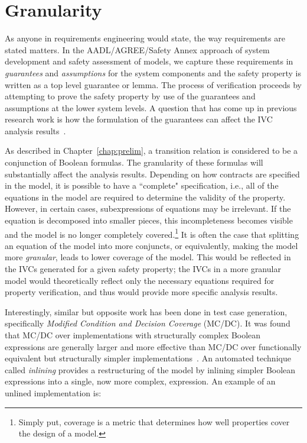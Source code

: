 \chapter{Granularity}
\label{chap:granularity}
As anyone in requirements engineering would state, the way requirements are stated matters. In the AADL/AGREE/Safety Annex approach of system development and safety assessment of models, we capture these requirements in \emph{guarantees} and \emph{assumptions} for the system components and the safety property is written as a top level guarantee or lemma. The process of verification proceeds by attempting to prove the safety property by use of the guarantees and assumptions at the lower system levels. A question that has come up in previous research work is how the formulation of the guarantees can affect the IVC analysis results~\cite{ghassabani_2018}. 

As described in Chapter~\ref{chap:prelim}, a transition relation is considered to be a conjunction of Boolean formulas. The granularity of these formulas will substantially affect the analysis results. Depending on how contracts are specified in the model, it is possible to have a ``complete" specification, i.e., all of the equations in the model are required to determine the validity of the property. However, in certain cases, subexpressions of equations may be irrelevant. If the equation is decomposed into smaller pieces, this incompleteness becomes visible and the model is no longer completely covered.\footnote{Simply put, coverage is a metric that determines how well properties cover the design of a model.} It is often the case that splitting an equation of the model into more conjuncts, or equivalently, making the model more \textit{granular}, leads to lower coverage of the model. This would be reflected in the IVCs generated for a given safety property; the IVCs in a more granular model would theoretically reflect only the necessary equations required for property verification, and thus would provide more specific analysis results.

Interestingly, similar but opposite work has been done in test case generation, specifically \emph{Modified Condition and Decision Coverage} (MC/DC). It was found that MC/DC over implementations with structurally complex Boolean expressions are generally larger and more effective than MC/DC over functionally equivalent but structurally simpler implementations~\cite{gay2016effect}. An automated technique called \emph{inlining} provides a restructuring of the model by inlining simpler Boolean expressions into a single, now more complex, expression. An example of an unlined implementation is: 

